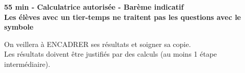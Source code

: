 \documentclass[11pt,a4paper]{article}  %
\begin{document}
	\graphicspath{{images/}}
	
	\begin{center}
		
	\end{center}
	\begin{center}\textbf{55 min - Calculatrice autorisée - Barème indicatif}\\
		\textbf{Les élèves avec un tier-temps ne traitent pas les questions avec  le symbole }
	\end{center}
	
	\begin{center}
		On veillera à ENCADRER ses résultats et soigner sa copie.\\
		Les résultats doivent être justifiés par des calculs (au moins 1 étape intermédiaire).
	\end{center}
	
\end{document}
